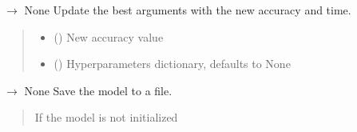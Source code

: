\documentclass[letterpaper,10pt,english]{sphinxmanual}
\begin{document}
\begin{fulllineitems}
\label{\detokenize{autoapi/src/LSTMTrainer/index:src.LSTMTrainer.__update_best_args}}
\pysigstartsignatures
\pysiglinewithargsret
{}
{\sphinxparamcomma {}}
{{ $\rightarrow$ None}}
\pysigstopsignatures
\sphinxAtStartPar
Update the best arguments with the new accuracy and time.
\begin{quote}\begin{description}
\begin{itemize}
\item {} 
\sphinxAtStartPar
{} () \textendash{} New accuracy value

\item {} 
\sphinxAtStartPar
{} (\sphinxstyleliteralemphasis{\sphinxupquote{, }}) \textendash{} Hyperparameters dictionary, defaults to None

\end{itemize}

\end{description}\end{quote}

\end{fulllineitems}


\begin{fulllineitems}
\label{\detokenize{autoapi/src/LSTMTrainer/index:src.LSTMTrainer.save_model}}
\pysigstartsignatures
\pysiglinewithargsret
{}
{}
{{ $\rightarrow$ None}}
\pysigstopsignatures
\sphinxAtStartPar
Save the model to a file.
\begin{quote}\begin{description}
\sphinxAtStartPar
{} \textendash{} If the model is not initialized

\end{description}\end{quote}

\end{fulllineitems}
\end{document}
